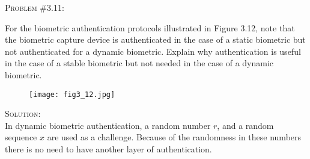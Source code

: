 \documentclass[12pt]{article}
\newenvironment{problem}[1]
{\begin{mdframed}[linewidth=0.8pt]
        \textsc{Problem #1:}

}
    {\end{mdframed}}
\newenvironment{solution}
    {\textsc{Solution:}\\}
    {\newpage}%
\begin{document}
	\begin{problem}{\#3.11}
		For the biometric authentication protocols illustrated in Figure 3.12,
		note that the biometric capture device is authenticated in the case of
		a static biometric but not authenticated for a dynamic biometric.
		Explain why authentication is useful in the case of a stable biometric
		but not needed in the case of a dynamic biometric.
	\end{problem}
	\begin{figure}[ht!]
		\centering
		\texttt{[image: fig3\_12.jpg]}
		\label{fig:3_12}
	\end{figure}
	\begin{solution}
		In dynamic biometric authentication, a random number $r$, and a random sequence $x$
		are used as a challenge. Because of the randomness in these numbers there is no need
		to have another layer of authentication.
	\end{solution}
\end{document}
